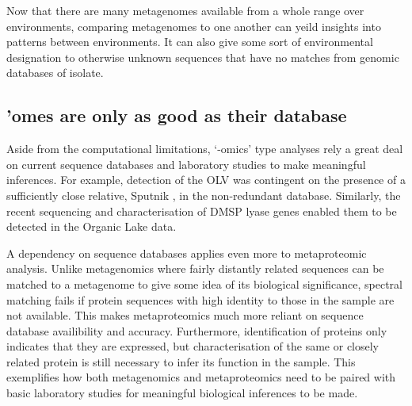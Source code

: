 Now that there are many metagenomes available from a whole range over environments, comparing metagenomes to one another can yeild insights into patterns between environments.
It can also give some sort of environmental designation to otherwise unknown sequences that have no matches from genomic databases of isolate.


\subsection{ 'omes are only as good as their database}
Aside from the computational limitations, `-omics' type analyses rely a great deal on current sequence databases and laboratory studies to make meaningful inferences.
For example, detection of the \ac{OLV} was contingent on the presence of a sufficiently close relative, Sputnik \cite{LaScola2008}, in the non-redundant database.
Similarly, the recent sequencing and characterisation of \ac{DMSP} lyase genes enabled them to be detected in the Organic Lake data.

A dependency on sequence databases applies even more to metaproteomic analysis.
Unlike metagenomics where fairly distantly related sequences can be matched to a metagenome to give some idea of its biological significance, spectral matching fails if protein sequences with high identity to those in the sample are not available.
This makes metaproteomics much more reliant on sequence database availibility and accuracy.
Furthermore, identification of proteins only indicates that they are expressed, but characterisation of the same or closely related protein is still necessary to infer its function in the sample.
This exemplifies how both metagenomics and metaproteomics need to be paired with basic laboratory studies for meaningful biological inferences to be made.

